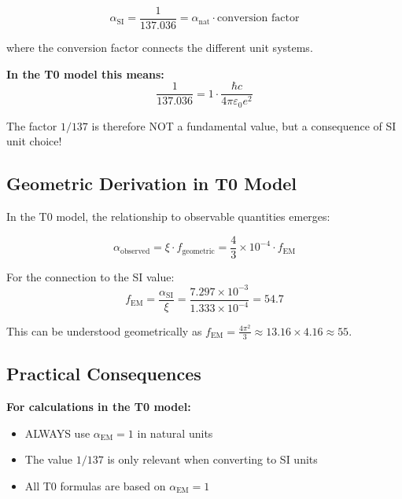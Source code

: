 \documentclass[12pt,a4paper]{report}
\begin{document}
\begin{equation}
	\alpha_{\text{SI}} = \frac{1}{137.036} = \alpha_{\text{nat}} \cdot \text{conversion factor}
\end{equation}

where the conversion factor connects the different unit systems.

\textbf{In the T0 model this means:}
\begin{equation}
	\frac{1}{137.036} = 1 \cdot \frac{\hbar c}{4\pi\varepsilon_0 e^2}
\end{equation}

The factor $1/137$ is therefore NOT a fundamental value, but a consequence of SI unit choice!

\subsection{Geometric Derivation in T0 Model}
\label{subsec:geometric_derivation_t0}

In the T0 model, the relationship to observable quantities emerges:

\begin{equation}
	\alpha_{\text{observed}} = \xi \cdot f_{\text{geometric}} = \frac{4}{3} \times 10^{-4} \cdot f_{\text{EM}}
\end{equation}

For the connection to the SI value:
\begin{equation}
	f_{\text{EM}} = \frac{\alpha_{\text{SI}}}{\xi} = \frac{7.297 \times 10^{-3}}{1.333 \times 10^{-4}} = 54.7
\end{equation}

This can be understood geometrically as $f_{\text{EM}} = \frac{4\pi^2}{3} \approx 13.16 \times 4.16 \approx 55$.

\subsection{Practical Consequences}
\label{subsec:practical_consequences}

\textbf{For calculations in the T0 model:}
\begin{itemize}
	\item ALWAYS use $\alpha_{\text{EM}} = 1$ in natural units
	\item The value $1/137$ is only relevant when converting to SI units
	\item All T0 formulas are based on $\alpha_{\text{EM}} = 1$
\end{itemize}
\end{document}
